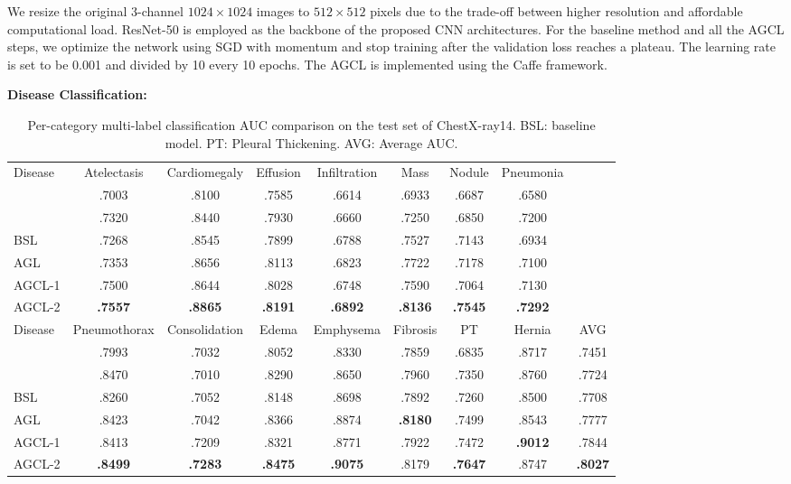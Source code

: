 \documentclass[runningheads,a4paper]{llncs}
\begin{document}
We resize the original 3-channel $1024 \times 1024$ images to $512 \times 512$ pixels due to the trade-off between higher resolution and affordable computational load. ResNet-50 \cite{He_CVPR2016} is employed as the backbone of the proposed CNN architectures. For the baseline method and all the AGCL steps, we optimize the network using SGD with momentum and stop training after the validation loss reaches a plateau. The learning rate is set to be 0.001 and divided by 10 every 10 epochs. The AGCL is implemented using the Caffe framework.

\textbf{Disease Classification:} 
\begin{table*}[!t] \fontsize{8.5pt}{8.5pt}\selectfont
	\renewcommand{\arraystretch}{1.2}
	\caption{Per-category multi-label classification AUC comparison on the test set of ChestX-ray14. BSL: baseline model. PT: Pleural Thickening. AVG: Average AUC.} 
	\label{table-results-cls-auc}
	\centering
	\begin{tabular}{@{}l||c|c|c|c|c|c|c||c}
		\cline{1-8}
		Disease &Atelectasis &Cardiomegaly &Effusion &Infiltration &Mass &Nodule &Pneumonia\\ \cline{1-8}
		\cite{Wang_CVPR2017} &.7003 &.8100 &.7585 &.6614 &.6933 &.6687 &.6580 \\ \cline{1-8}
        \cite{Wang_2018_CVPR} &.7320 &.8440 &.7930 &.6660 &.7250 &.6850 &.7200 \\ \cline{1-8}
		BSL &.7268 &.8545 &.7899 &.6788 &.7527 &.7143 &.6934 \\ \cline{1-8}
		AGL &.7353 &.8656 &.8113 &.6823 &.7722 &.7178 &.7100 \\ \cline{1-8}
		AGCL-1 &.7500 &.8644 &.8028 &.6748 &.7590 &.7064 &.7130 \\ \cline{1-8}
		AGCL-2 &\textbf{.7557} &\textbf{.8865} &\textbf{.8191} &\textbf{.6892} &\textbf{.8136} &\textbf{.7545} &\textbf{.7292}\\ \hline \hline
		Disease &Pneumothorax &Consolidation &Edema &Emphysema &Fibrosis &PT &Hernia &AVG\\ \hline
		\cite{Wang_CVPR2017} &.7993 &.7032 &.8052 &.8330 &.7859 &.6835 &.8717 &.7451\\ \hline
        \cite{Wang_2018_CVPR} &.8470 &.7010 &.8290 &.8650 &.7960 &.7350 &.8760 &.7724\\ \hline
		BSL &.8260 &.7052 &.8148 &.8698 &.7892 &.7260 &.8500 &.7708\\ \hline
		AGL &.8423 &.7042 &.8366 &.8874 &\textbf{.8180} &.7499 &.8543 &.7777\\ \hline
		AGCL-1 &.8413 &.7209 &.8321 &.8771 &.7922 &.7472 &\textbf{.9012} &.7844\\ \hline
		AGCL-2 &\textbf{.8499} &\textbf{.7283} &\textbf{.8475} &\textbf{.9075} &.8179 &\textbf{.7647} &.8747 & \textbf{.8027}\\ \hline
	\end{tabular}
\end{table*}
\end{document}
